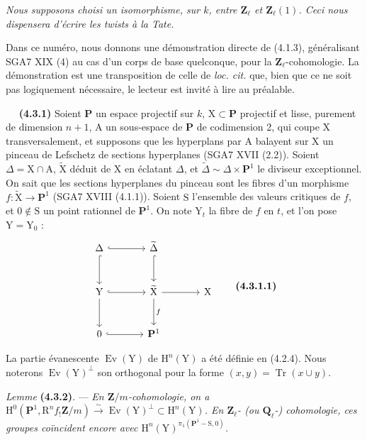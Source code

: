 \documentclass[11pt,leqno]{article}
\newcommand{\Page}[1]{\ifvmode\noindent\else\unskip\ \fi{\footnotesize\textcolor{gray}{[p.\,#1]}}\ \ignorespaces}
\begin{document}
\textit{Nous supposons choisi un isomorphisme, sur \(k\), entre \(\mathbf{Z}_\ell\) et \(\mathbf{Z}_\ell(1)\). Ceci nous dispensera d’écrire les twists à la Tate.}

Dans ce numéro, nous donnons une démonstration directe de (4.1.3), généralisant SGA7 XIX (4) au cas d’un corps de base quelconque, pour la \(\mathbf{Z}_\ell\)-cohomologie. La démonstration est une transposition de celle de \textit{loc. cit.} que, bien que ce ne soit pas logiquement nécessaire, le lecteur est invité à lire au préalable.

\Page{222}
\textbf{(4.3.1)} Soient \(\mathbf{P}\) un espace projectif sur \(k\), \(\mathrm{X}\subset\mathbf{P}\) projectif et lisse, purement de dimension \(n+1\), \(\mathrm{A}\) un sous-espace de \(\mathbf{P}\) de codimension 2, qui coupe \(\mathrm{X}\) transversalement, et supposons que les hyperplans par \(\mathrm{A}\) balayent sur \(\mathrm{X}\) un pinceau de Lefschetz de sections hyperplanes (SGA7 XVII (2.2)). Soient \(\Delta=\mathrm{X}\cap\mathrm{A}\), \(\widetilde{\mathrm{X}}\) déduit de \(\mathrm{X}\) en éclatant \(\Delta\), et \(\widetilde{\Delta}\sim\Delta\times\mathbf{P}^1\) le diviseur exceptionnel. On sait que les sections hyperplanes du pinceau sont les fibres d’un morphisme \(f:\widetilde{\mathrm{X}}\to\mathbf{P}^1\) (SGA7 XVIII (4.1.1)). Soient \(\mathrm{S}\) l’ensemble des valeurs critiques de \(f\), et \(0\notin\mathrm{S}\) un point rationnel de \(\mathbf{P}^1\). On note \(\mathrm{Y}_t\) la fibre de \(f\) en \(t\), et l’on pose \(\mathrm{Y}=\mathrm{Y}_0\) :
\[
\begin{tikzcd}[column sep=large,row sep=large]
\Delta \arrow[r,hook] \arrow[d,hook]
  & \widetilde{\Delta} \arrow[d,hook] & {} \\
\mathrm{Y} \arrow[r,hook] \arrow[d]
  & \widetilde{\mathrm{X}} \arrow[r] \arrow[d,"f"]
  & \mathrm{X} \\
0 \arrow[r,hook] & \mathbf{P}^1 & {}
\end{tikzcd}
\tag*{\textbf{(4.3.1.1)}}
\]

La partie évanescente \(\operatorname{Ev}(\mathrm{Y})\) de \(\mathrm{H}^n(\mathrm{Y})\) a été définie en (4.2.4). Nous noterons \(\operatorname{Ev}(\mathrm{Y})^\perp\) son orthogonal pour la forme \((x,y)=\operatorname{Tr}(x\cup y)\).

\textit{Lemme} \textbf{(4.3.2)}. — \textit{En \(\mathbf{Z}/m\)-cohomologie, on a \(\mathrm{H}^0(\mathbf{P}^1,\mathrm{R}^n f_!\mathbf{Z}/m)\xrightarrow{\sim}\operatorname{Ev}(\mathrm{Y})^\perp\subset\mathrm{H}^n(\mathrm{Y})\). En \(\mathbf{Z}_\ell\)- (ou \(\mathbf{Q}_\ell\)-) cohomologie, ces groupes coïncident encore avec \(\mathrm{H}^n(\mathrm{Y})^{\pi_1(\mathbf{P}^1-\mathrm{S},0)}\).}
\end{document}
